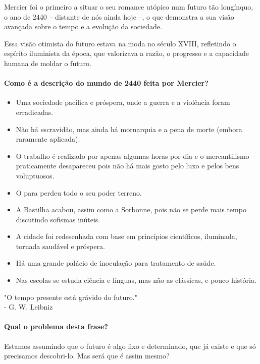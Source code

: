 Mercier foi o primeiro a situar o seu romance utópico num futuro tão longínquo, o ano de 2440 -- distante de nós ainda hoje --, o que demonstra a sua visão avançada sobre o tempo e a evolução da sociedade.

Essa visão otimista do futuro estava na moda no século XVIII, refletindo o espírito iluminista da época, que valorizava a razão, o progresso e a capacidade humana de moldar o futuro.


\paragraph{Como é a descrição do mundo de 2440 feita por Mercier?}
\begin{itemize}
  \item Uma sociedade pacífica e próspera, onde a guerra e a violência foram erradicadas.
  \item Não há escravidão, mas ainda há mornarquia e a pena de morte (embora raramente aplicada).
  \item O trabalho é realizado por apenas algumas horas por dia e o mercantilismo praticamente desapareceu pois não há mais gosto pelo luxo e pelos bens voluptuosos.
  \item O para perdeu todo o seu poder terreno.
  \item A Bastilha acabou, assim como a Sorbonne, pois não se perde mais tempo discutindo sofismas inúteis.
  \item A cidade foi redesenhada com base em princípios científicos, iluminada, tornada saudável e próspera.
  \item Há uma grande palácio de inoculação para tratamento de saúde.
  \item Nas escolas se estuda ciência e línguas, mas não as clássicas, e pouco história.
\end{itemize}


\begin{thinkerquote}
  "O tempo presente está grávido do futuro."
  \\ \hfill - G. W. Leibniz
\end{thinkerquote}

\paragraph{Qual o problema desta frase?} Estamos assumindo que o futuro é algo fixo e determinado, que já existe e que só precisamos descobri-lo. Mas será que é assim mesmo?

